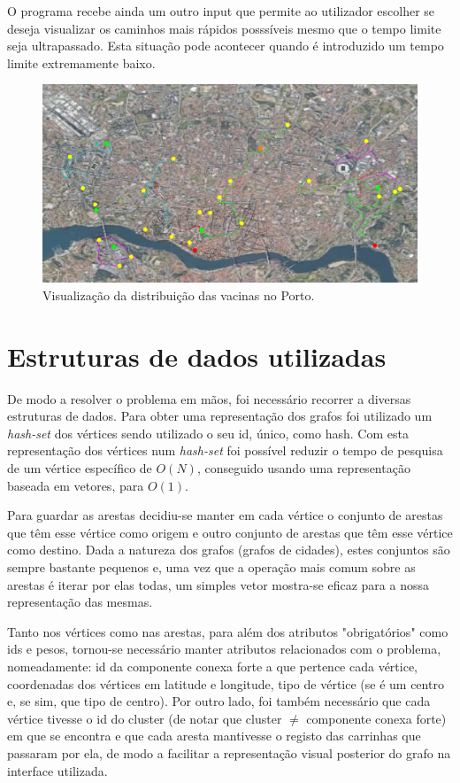 \documentclass[12pt,a4paper]{report}
\begin{document}
O programa recebe ainda um outro input que permite ao utilizador escolher se deseja visualizar os caminhos mais rápidos posssíveis mesmo que o tempo limite seja ultrapassado.
Esta situação pode acontecer quando é introduzido um tempo limite extremamente baixo.

\begin{figure}[H]
	\includegraphics[width=1.0\textwidth]{./imgs/funcs/distribute.png}
	\centering
	\caption{Visualização da distribuição das vacinas no Porto.}
\end{figure}


\chapter{Estruturas de dados utilizadas}
De modo a resolver o problema em mãos, foi necessário recorrer a diversas estruturas de dados. Para obter uma representação
dos grafos foi utilizado um \textit{hash-set} dos vértices sendo utilizado o seu id, único, como hash. Com esta representação
dos vértices num \textit{hash-set} foi possível reduzir o tempo de pesquisa de um vértice específico de \( O(N) \), conseguido
usando uma representação baseada em vetores, para \( O(1) \). \par

Para guardar as arestas decidiu-se manter em cada vértice o conjunto de arestas que têm esse vértice como origem e outro
conjunto de arestas que têm esse vértice como destino. Dada a natureza dos grafos (grafos de cidades), estes conjuntos são sempre
bastante pequenos e, uma vez que a operação mais comum sobre as arestas é iterar por elas todas, um simples vetor mostra-se eficaz
para a nossa representação das mesmas. \par

Tanto nos vértices como nas arestas, para além dos atributos "obrigatórios" como ids e pesos, tornou-se necessário manter 
atributos relacionados com o problema, nomeadamente: id da componente conexa forte a que pertence cada vértice, coordenadas dos
vértices em latitude e longitude, tipo de vértice (se é um centro e, se sim, que tipo de centro). Por outro lado, foi também necessário que 
cada vértice tivesse o id do cluster (de notar que cluster \( \neq \) componente conexa forte) em que se encontra e que cada
aresta mantivesse o registo das carrinhas que passaram por ela, de modo a facilitar a representação visual posterior do grafo na interface
utilizada. \par
\end{document}
